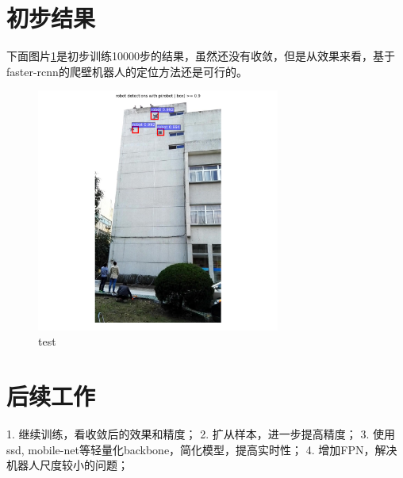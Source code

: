 \documentclass[UTF8]{ctexart}
\begin{document}
\section{初步结果}
下面图片\ref{fig:demo_test}是初步训练10000步的结果，虽然还没有收敛，但是从效果来看，基于faster-rcnn的爬壁机器人的定位方法还是可行的。
\begin{figure}[!h]
	\centerline{\includegraphics[width=8cm]{images/result_demo.png}}
	\caption{test}
	\label{fig:demo_test}
\end{figure}

\section{后续工作}
1. 继续训练，看收敛后的效果和精度；
2. 扩从样本，进一步提高精度；
3. 使用ssd, mobile-net等轻量化backbone，简化模型，提高实时性；
4. 增加FPN，解决机器人尺度较小的问题；




\end{document}
